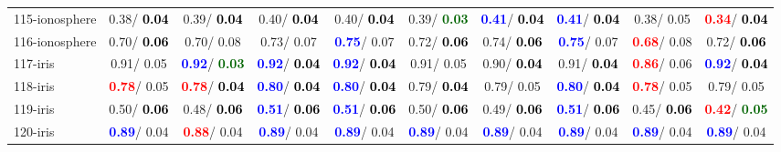 \begin{table}[h]
\begin{center}
{\begin{tabular}{lc|c|c|c|c|c|c|c|c}
115-ionosphere &   0.38/\textcolor{black}{\textbf{  0.04}} &   0.39/\textcolor{black}{\textbf{  0.04}} &   0.40/\textcolor{black}{\textbf{  0.04}} &   0.40/\textcolor{black}{\textbf{  0.04}} &   0.39/\textcolor{darkgreen}{\textbf{  0.03}} & \textcolor{blue}{\textbf{  0.41}}/\textcolor{black}{\textbf{  0.04}} & \textcolor{blue}{\textbf{  0.41}}/\textcolor{black}{\textbf{  0.04}} &   0.38/  0.05 & \textcolor{red}{\textbf{  0.34}}/\textcolor{black}{\textbf{  0.04}} \\
116-ionosphere &   0.70/\textcolor{black}{\textbf{  0.06}} &   0.70/  0.08 &   0.73/  0.07 & \textcolor{blue}{\textbf{  0.75}}/  0.07 &   0.72/\textcolor{black}{\textbf{  0.06}} &   0.74/\textcolor{black}{\textbf{  0.06}} & \textcolor{blue}{\textbf{  0.75}}/  0.07 & \textcolor{red}{\textbf{  0.68}}/  0.08 &   0.72/\textcolor{black}{\textbf{  0.06}} \\
117-iris &   0.91/  0.05 & \textcolor{blue}{\textbf{  0.92}}/\textcolor{darkgreen}{\textbf{  0.03}} & \textcolor{blue}{\textbf{  0.92}}/\textcolor{black}{\textbf{  0.04}} & \textcolor{blue}{\textbf{  0.92}}/\textcolor{black}{\textbf{  0.04}} &   0.91/  0.05 &   0.90/\textcolor{black}{\textbf{  0.04}} &   0.91/\textcolor{black}{\textbf{  0.04}} & \textcolor{red}{\textbf{  0.86}}/  0.06 & \textcolor{blue}{\textbf{  0.92}}/\textcolor{black}{\textbf{  0.04}} \\ \hline
118-iris & \textcolor{red}{\textbf{  0.78}}/  0.05 & \textcolor{red}{\textbf{  0.78}}/\textcolor{black}{\textbf{  0.04}} & \textcolor{blue}{\textbf{  0.80}}/\textcolor{black}{\textbf{  0.04}} & \textcolor{blue}{\textbf{  0.80}}/\textcolor{black}{\textbf{  0.04}} &   0.79/\textcolor{black}{\textbf{  0.04}} &   0.79/  0.05 & \textcolor{blue}{\textbf{  0.80}}/\textcolor{black}{\textbf{  0.04}} & \textcolor{red}{\textbf{  0.78}}/  0.05 &   0.79/  0.05 \\
119-iris &   0.50/\textcolor{black}{\textbf{  0.06}} &   0.48/\textcolor{black}{\textbf{  0.06}} & \textcolor{blue}{\textbf{  0.51}}/\textcolor{black}{\textbf{  0.06}} & \textcolor{blue}{\textbf{  0.51}}/\textcolor{black}{\textbf{  0.06}} &   0.50/\textcolor{black}{\textbf{  0.06}} &   0.49/\textcolor{black}{\textbf{  0.06}} & \textcolor{blue}{\textbf{  0.51}}/\textcolor{black}{\textbf{  0.06}} &   0.45/\textcolor{black}{\textbf{  0.06}} & \textcolor{red}{\textbf{  0.42}}/\textcolor{darkgreen}{\textbf{  0.05}} \\
120-iris & \textcolor{blue}{\textbf{  0.89}}/  0.04 & \textcolor{red}{\textbf{  0.88}}/  0.04 & \textcolor{blue}{\textbf{  0.89}}/  0.04 & \textcolor{blue}{\textbf{  0.89}}/  0.04 & \textcolor{blue}{\textbf{  0.89}}/  0.04 & \textcolor{blue}{\textbf{  0.89}}/  0.04 & \textcolor{blue}{\textbf{  0.89}}/  0.04 & \textcolor{blue}{\textbf{  0.89}}/  0.04 & \textcolor{blue}{\textbf{  0.89}}/  0.04 \\

\end{tabular}}
\end{center}
\end{table}
